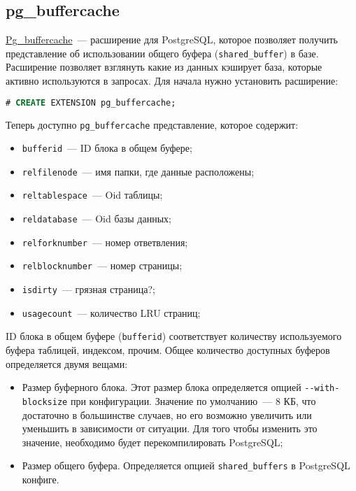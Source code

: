 \subsection{pg\_buffercache}

\href{http://www.postgresql.org/docs/current/static/pgbuffercache.html}{Pg\_buffercache}~--- расширение для PostgreSQL, которое позволяет получить представление об использовании общего буфера (\lstinline!shared_buffer!) в базе. Расширение позволяет взглянуть какие из данных кэширует база, которые активно используются в запросах. Для начала нужно установить расширение:

\begin{lstlisting}[language=SQL,label=lst:pgbuffercache1,caption=pg\_buffercache]
# CREATE EXTENSION pg_buffercache;
\end{lstlisting}

Теперь доступно \lstinline!pg_buffercache! представление, которое содержит:

\begin{itemize}
  \item \lstinline!bufferid!~--- ID блока в общем буфере;
  \item \lstinline!relfilenode!~--- имя папки, где данные расположены;
  \item \lstinline!reltablespace!~--- Oid таблицы;
  \item \lstinline!reldatabase!~--- Oid базы данных;
  \item \lstinline!relforknumber!~--- номер ответвления;
  \item \lstinline!relblocknumber!~--- номер страницы;
  \item \lstinline!isdirty!~--- грязная страница?;
  \item \lstinline!usagecount!~--- количество LRU страниц;
\end{itemize}

ID блока в общем буфере (\lstinline!bufferid!) соответствует количеству используемого буфера таблицей, индексом, прочим. Общее количество доступных буферов определяется двумя вещами:

\begin{itemize}
  \item Размер буферного блока. Этот размер блока определяется опцией \lstinline!--with-blocksize! при конфигурации. Значение по умолчанию~--- 8 КБ, что достаточно в большинстве случаев, но его возможно увеличить или уменьшить в зависимости от ситуации. Для того чтобы изменить это значение, необходимо будет перекомпилировать PostgreSQL;
  \item Размер общего буфера. Определяется опцией \lstinline!shared_buffers! в PostgreSQL конфиге.
\end{itemize}

